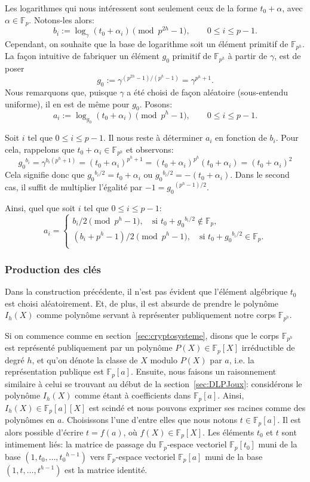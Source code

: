 \documentclass[a4paper, titlepage, 11pt]{article}
\theoremstyle{definition}
\theoremstyle{remark}
\def\gf #1{\mathbb{F}_{#1}}
\begin{document}
Les logarithmes qui nous intéressent sont seulement ceux de la forme ${t_0} + \alpha$, avec $\alpha \in \gf{p}$. Notons-les alors:
$$b_i := \log_\gamma\left({t_0} + \alpha_{i}\right) \pmod{p^{2h}-1}, \qquad 0 \leqslant i \leqslant p-1.$$
Cependant, on souhaite que la base de logarithme soit un élément primitif de $\gf{p^h}$. La façon intuitive de fabriquer un élément $g_0$ primitif de $\gf{p^h}$ à partir de $\gamma$, est de poser 
$$g_0 := \gamma^{(p^{2h}-1)/(p^h-1)}=\gamma^{p^h+1}.$$
Nous remarquons que, puisque $\gamma$ a été choisi de façon aléatoire (sous-entendu uniforme), il en est de même pour $g_0$.
Posons:
$$a_i := \log_{g_0}\left({t_0} + \alpha_{i}\right) \pmod{p^h-1}, \qquad 0 \leqslant i \leqslant p-1.$$

Soit $i$ tel que $0 \leqslant i \leqslant p-1$. Il nous reste à déterminer $a_i$ en fonction de $b_i$. Pour cela, rappelons que ${t_0}+\alpha_i \in \gf{p^h}$ et observons:
$${g_0}^{b_i} = \gamma^{b_i(p^h+1)} = ({t_0}+\alpha_i)^{p^h+1} = ({t_0}+\alpha_i)^{p^h}({t_0}+\alpha_i) = ({t_0}+\alpha_i)^2$$
Cela signifie donc que ${g_0}^{b_i/2} = {t_0}+\alpha_i$ ou ${g_0}^{b_i/2} = -({t_0}+\alpha_i)$. Dans le second cas, il suffit de multiplier l'égalité par $-1 = {g_0}^{(p^h-1)/2}$. 

Ainsi, quel que soit $i$ tel que $0 \leqslant i \leqslant p-1$:
$$a_i = \left\{\begin{array}{l}
b_i / 2 \pmod{p^h-1}, \quad \text{si } {t_0} + {g_0}^{b_i/2} \not\in \gf{p}, \\
(b_i + p^h - 1) / 2 \pmod{p^h-1}, \quad \text{si } {t_0} + {g_0}^{b_i/2} \in \gf{p}. \\
\end{array}\right.$$

\subsubsection{Production des clés}

Dans la construction précédente, il n'est pas évident que l'élément algébrique ${t_0}$ est choisi aléatoirement. Et, de plus, il est absurde de prendre le polynôme $I_h(X)$ comme polynôme servant à représenter publiquement notre corps $\gf{p^h}$.

Si on commence comme en section~\ref{sec:cryptosysteme}, disons que le corps $\gf{p^h}$ est représenté publiquement par un polynôme $P(X)\in\gf{p}[X]$ irréductible de degré $h$, et qu'on dénote la classe de $X$ modulo $P(X)$ par $a$, i.e. la représentation publique est $\gf{p}[a]$. Ensuite, nous faisons un raisonnement similaire à celui se trouvant au début de la section~\ref{sec:DLPJoux}: considérons le polynôme $I_h(X)$ comme étant à coefficients dans $\gf{p}[a]$. Ainsi, $I_h(X) \in \gf{p}[a][X]$ est scindé et nous pouvons exprimer ses racines comme des polynômes en $a$. Choisissons l'une d'entre elles que nous notons $t \in \gf{p}[a]$. Il est alors possible d'écrire $t = f(a)$, où $f(X) \in \gf{p}[X]$. Les éléments $t_0$ et $t$ sont intimement liés: la matrice de passage du $\gf{p}$-espace vectoriel $\gf{p}[t_0]$ muni de la base $(1,t_0,\dots,{t_0}^{h-1})$ vers $\gf{p}$-espace vectoriel $\gf{p}[a]$ muni de la base $(1,t,\dots,{t}^{h-1})$ est la matrice identité.
\end{document}
